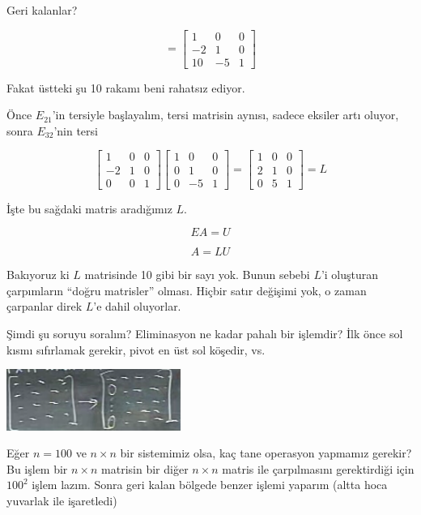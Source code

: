 \documentclass[12pt,fleqn]{article}\usepackage{../../common}
\begin{document}
Geri kalanlar? 

$$ = 
\left[\begin{array}{rrr}
1 & 0 & 0 \\
-2 & 1 & 0 \\
10 & -5 & 1
\end{array}\right]
 $$

Fakat üstteki şu 10 rakamı beni rahatsız ediyor. 

Önce $E_{21}$'in tersiyle başlayalım, tersi matrisin aynısı, sadece eksiler
artı oluyor, sonra  $E_{32}$'nin tersi

$$ 
\left[\begin{array}{rrr}
1 & 0 & 0 \\
-2 & 1 & 0 \\
0 & 0 & 1
\end{array}\right]
\left[\begin{array}{rrr}
1 & 0 & 0 \\
0 & 1 & 0 \\
0 & -5 & 1
\end{array}\right]
=
\left[\begin{array}{rrr}
1 & 0 & 0 \\
2 & 1 & 0 \\
0 & 5 & 1
\end{array}\right] = L
 $$

İşte bu sağdaki matris aradığımız $L$. 

$$ EA = U $$

$$ A = LU $$

Bakıyoruz ki $L$ matrisinde 10 gibi bir sayı yok. Bunun sebebi $L$'i
oluşturan çarpımların ``doğru matrisler'' olması. Hiçbir satır değişimi
yok, o zaman çarpanlar direk $L$'e dahil oluyorlar. 

Şimdi şu soruyu soralım? Eliminasyon ne kadar pahalı bir işlemdir? İlk önce
sol kısmı sıfırlamak gerekir, pivot en üst sol köşedir, vs.

\includegraphics[height=2cm]{01.png}

Eğer $n=100$ ve $n \times n$ bir sistemimiz olsa, kaç tane operasyon yapmamız
gerekir? Bu işlem bir  $n \times n$ matrisin bir diğer  $n \times n$ matris ile
çarpılmasını gerektirdiği için $100^2$ işlem lazım. Sonra geri kalan
bölgede benzer işlemi yaparım (altta hoca yuvarlak ile işaretledi)
\end{document}
